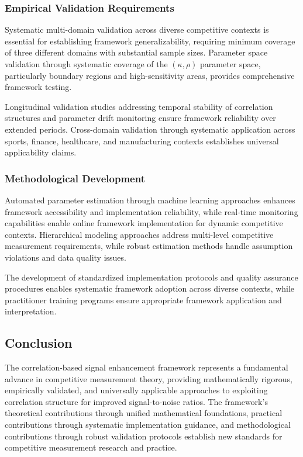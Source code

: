 \subsubsection{Empirical Validation Requirements}

Systematic multi-domain validation across diverse competitive contexts is essential for establishing framework generalizability, requiring minimum coverage of three different domains with substantial sample sizes. Parameter space validation through systematic coverage of the $(\kappa, \rho)$ parameter space, particularly boundary regions and high-sensitivity areas, provides comprehensive framework testing.

Longitudinal validation studies addressing temporal stability of correlation structures and parameter drift monitoring ensure framework reliability over extended periods. Cross-domain validation through systematic application across sports, finance, healthcare, and manufacturing contexts establishes universal applicability claims.

\subsubsection{Methodological Development}

Automated parameter estimation through machine learning approaches enhances framework accessibility and implementation reliability, while real-time monitoring capabilities enable online framework implementation for dynamic competitive contexts. Hierarchical modeling approaches address multi-level competitive measurement requirements, while robust estimation methods handle assumption violations and data quality issues.

The development of standardized implementation protocols and quality assurance procedures enables systematic framework adoption across diverse contexts, while practitioner training programs ensure appropriate framework application and interpretation.

\subsection{Conclusion}

The correlation-based signal enhancement framework represents a fundamental advance in competitive measurement theory, providing mathematically rigorous, empirically validated, and universally applicable approaches to exploiting correlation structure for improved signal-to-noise ratios. The framework's theoretical contributions through unified mathematical foundations, practical contributions through systematic implementation guidance, and methodological contributions through robust validation protocols establish new standards for competitive measurement research and practice.

